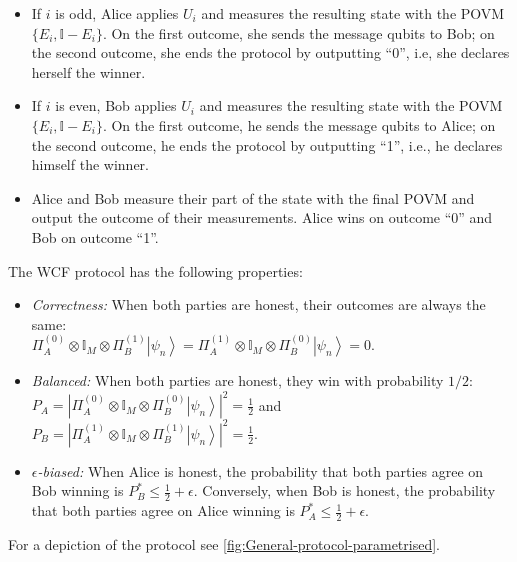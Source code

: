 \documentclass{theoretics}
\begin{document}
\begin{definition}
\begin{itemize}
          \begin{itemize}
            \item If $i$ is odd, Alice applies $U_{i}$ and measures the resulting
                  state with the POVM $\{E_{i},\mathbb{I}-E_{i}\}$. On the first outcome,
                  she sends the message qubits to Bob; on the second outcome, she
                  ends the protocol by outputting ``0'', i.e, she declares herself
                  the winner.
            \item If $i$ is even, Bob applies $U_{i}$ and measures the resulting state
                  with the POVM $\{E_{i},\mathbb{I}-E_{i}\}$. On the first outcome,
                  he sends the message qubits to Alice; on the second outcome, he ends
                  the protocol by outputting ``1'', i.e., he declares himself the winner.
            \item Alice and Bob measure their part of the state with the final POVM
                  and output the outcome of their measurements. Alice wins on outcome
                  ``0'' and Bob on outcome ``1''.
          \end{itemize}
  \end{itemize}
  The WCF protocol has the following properties:
  \begin{itemize}
    \item \emph{Correctness:} When both parties are honest, their outcomes
          are always the same: \\
          $\Pi_{A}^{(0)}\otimes\mathbb{I}_{M}\otimes\Pi_{B}^{(1)}\left|\psi_{n}\right\rangle =\Pi_{A}^{(1)}\otimes\mathbb{I}_{M}\otimes\Pi_{B}^{(0)}\left|\psi_{n}\right\rangle =0$.
    \item \emph{Balanced:} When both parties are honest, they win with probability
          $1/2$: \\
          $P_{A}=\left|\Pi_{A}^{(0)}\otimes\mathbb{I}_{M}\otimes\Pi_{B}^{(0)}\left|\psi_{n}\right\rangle \right|^{2}=\frac{1}{2}$
          and $P_{B}=\left|\Pi_{A}^{(1)}\otimes\mathbb{I}_{M}\otimes\Pi_{B}^{(1)}\left|\psi_{n}\right\rangle \right|^{2}=\frac{1}{2}.$
    \item \emph{$\epsilon$-biased:} When Alice is honest, the probability that both
          parties agree on Bob winning is $P_{B}^{*}\le\frac{1}{2}+\epsilon$.
          Conversely, when Bob is honest, the probability that both parties
          agree on Alice winning is $P_{A}^{*}\le\frac{1}{2}+\epsilon$.
  \end{itemize}
\end{definition}
For a depiction of the protocol see  \cref{fig:General-protocol-parametrised}.
\end{document}
